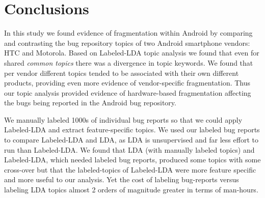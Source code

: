 \documentclass[10pt, conference, compsocconf]{IEEEtran}
\begin{document}
\section{Conclusions}
\label{sec:conclusions}

In this study we found evidence of fragmentation within Android by
comparing and contrasting the bug repository topics of 
two Android smartphone vendors: HTC and Motorola.
Based on Labeled-LDA topic analysis we found that even for shared \emph{common
topics} there was a divergence in topic keywords. We found that per vendor
different topics tended to be associated with their own different
products, providing even more evidence of vendor-specific fragmentation.
Thus our topic analysis provided evidence of hardware-based
fragmentation affecting the bugs being reported in the Android bug
repository.

We manually labeled 1000s of individual bug reports so that we could
apply Labeled-LDA and extract 
 feature-specific topics. We used our labeled bug reports to compare Labeled-LDA
and LDA, as LDA is unsupervised and far less effort to run than
Labeled-LDA.
We found that LDA (with manually labeled topics) and Labeled-LDA,
which needed labeled bug reports, produced some topics with some
cross-over but that the labeled-topics of Labeled-LDA were more
feature specific and more useful to our analysis. Yet the cost of
labeling bug-reports versus labeling LDA topics almost 2 orders of
magnitude greater in terms of man-hours.


\end{document}
